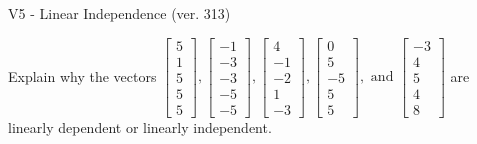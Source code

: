 \begin{exercise}
  \begin{exerciseTitle}V5 - Linear Independence (ver. 313)\end{exerciseTitle}
  \begin{exerciseStatement}
    Explain why the vectors \(\left[\begin{array}{r}
5 \\
1 \\
5 \\
5 \\
5
\end{array}\right] , \left[\begin{array}{r}
-1 \\
-3 \\
-3 \\
-5 \\
-5
\end{array}\right] , \left[\begin{array}{r}
4 \\
-1 \\
-2 \\
1 \\
-3
\end{array}\right] , \left[\begin{array}{r}
0 \\
5 \\
-5 \\
5 \\
5
\end{array}\right] , \text{ and } \left[\begin{array}{r}
-3 \\
4 \\
5 \\
4 \\
8
\end{array}\right]\) are linearly dependent or linearly independent.	



\end{exerciseStatement}
\end{exercise}
